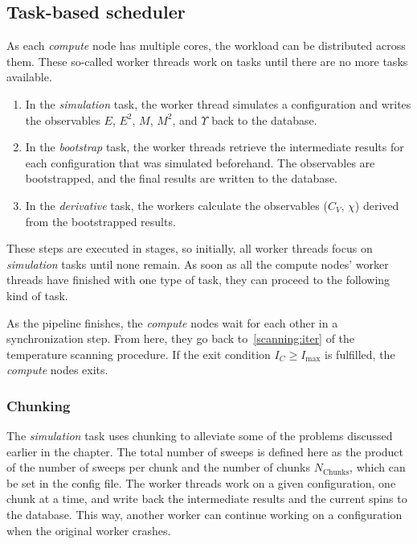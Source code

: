 \subsection{Task-based scheduler}\label{sec:impl:tasks}
	As each \emph{compute} node has multiple cores, the workload can be distributed across them. These so-called worker threads work on tasks until there are no more tasks available.
	\begin{enumerate}
		\item In the \emph{simulation} task, the worker thread simulates a configuration and writes the observables $E$, $E^2$, $M$, $M^2$, and $\Upsilon$ back to the database.
		\item In the \emph{bootstrap} task, the worker threads retrieve the intermediate results for each configuration that was simulated beforehand. The observables are bootstrapped, and the final results are written to the database.
		\item In the \emph{derivative} task, the workers calculate the observables ($C_V$, $\chi$) derived from the bootstrapped results.
	\end{enumerate}
	These steps are executed in stages, so initially, all worker threads focus on \emph{simulation} tasks until none remain. As soon as all the compute nodes' worker threads have finished with one type of task, they can proceed to the following kind of task.
	
	As the pipeline finishes, the \emph{compute} nodes wait for each other in a synchronization step. From here, they go back to~\cref{scanning:iter} of the temperature scanning procedure. If the exit condition $I_C \ge I_\text{max}$ is fulfilled, the \emph{compute} nodes exits.

	\subsubsection{Chunking}\label{sec:impl:tasks:chunks}
		The \emph{simulation} task uses chunking to alleviate some of the problems discussed earlier in the chapter. The total number of sweeps is defined here as the product of the number of sweeps per chunk and the number of chunks $N_\text{Chunks}$, which can be set in the config file. The worker threads work on a given configuration, one chunk at a time, and write back the intermediate results and the current spins to the database. This way, another worker can continue working on a configuration when the original worker crashes.

